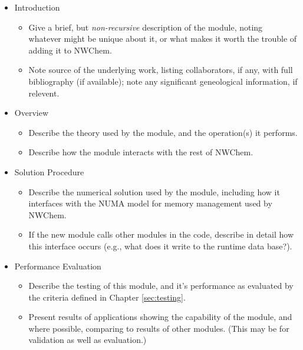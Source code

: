 \begin{itemize}

\item Introduction

\begin{itemize}
\item Give a brief, but {\em non-recursive} description of the module, noting
whatever might be unique about it, or what makes it worth the trouble of
adding it to NWChem.
\item Note source of the underlying work, listing collaborators, if any, with full
bibliography (if available); note any significant geneological information, if relevent.
\end{itemize}

\item Overview

\begin{itemize}
\item Describe the theory used by the module, and the operation(s) it performs.
\item Describe how the module interacts with the rest of
NWChem.
\end{itemize}

\item Solution Procedure

\begin{itemize}
\item Describe the numerical solution used by the module, including how it interfaces
with the NUMA model for memory management used by NWChem.
\item If the new module calls other modules in the code, describe in detail how
this interface occurs (e.g., what does it write to the runtime data base?).
\end{itemize}

\item Performance Evaluation

\begin{itemize}
\item Describe the testing of this module, and it's performance as evaluated by
the criteria defined in Chapter \ref{sec:testing}.
\item Present results of applications showing the capability of the module, and
where possible, comparing to results of other modules.  (This may be for validation
as well as evaluation.)
\end{itemize}

\end{itemize}

